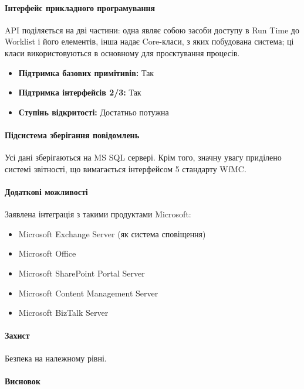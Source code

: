 \documentclass{memoir}
\begin{document}
\paragraph{Інтерфейс прикладного програмування}

API поділяється на дві частини: одна являє собою засоби доступу в Run Time до Worklist і його елементів, інша надає Core-класи, з яких побудована система; ці класи використовуються в основному для проєктування процесів.

\begin{itemize}
    \item \textbf{Підтримка базових примітивів:} Так
    \item \textbf{Підтримка інтерфейсів 2/3:} Так
    \item \textbf{Ступінь відкритості:} Достатньо потужна
\end{itemize}

\paragraph{Підсистема зберігання повідомлень}

Усі дані зберігаються на MS SQL сервері. Крім того, значну увагу приділено системі звітності, що вимагається інтерфейсом 5 стандарту WfMC.

\paragraph{Додаткові можливості}

Заявлена інтеграція з такими продуктами Microsoft:

\begin{itemize}
    \item Microsoft Exchange Server (як система сповіщення)
    \item Microsoft Office
    \item Microsoft SharePoint Portal Server
    \item Microsoft Content Management Server
    \item Microsoft BizTalk Server
\end{itemize}

\paragraph{Захист}

Безпека на належному рівні.

\paragraph{Висновок}
\end{document}
